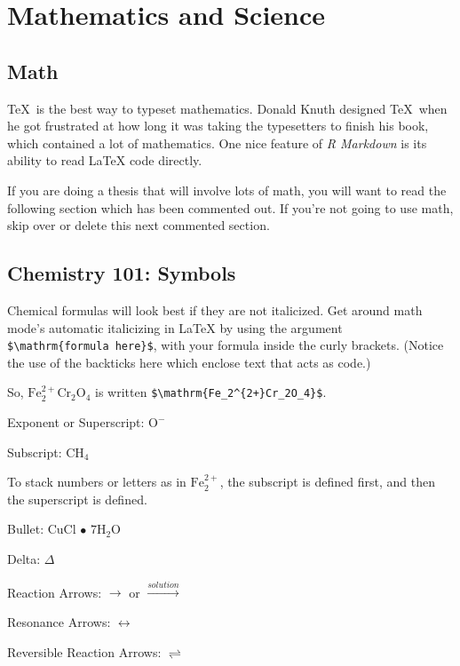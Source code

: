 \documentclass[12pt,twoside]{reedthesis}
\theoremstyle{definition}
\theoremstyle{definition}
\theoremstyle{definition}
\theoremstyle{remark}
\begin{document}
\chapter{Mathematics and Science}\label{math-sci}

\section{Math}\label{math}

\TeX~is the best way to typeset mathematics. Donald Knuth designed
\TeX~when he got frustrated at how long it was taking the typesetters to
finish his book, which contained a lot of mathematics. One nice feature
of \emph{R Markdown} is its ability to read LaTeX code directly.

If you are doing a thesis that will involve lots of math, you will want
to read the following section which has been commented out. If you're
not going to use math, skip over or delete this next commented section.

\section{Chemistry 101: Symbols}\label{chemistry-101-symbols}

Chemical formulas will look best if they are not italicized. Get around
math mode's automatic italicizing in LaTeX by using the argument
\texttt{\$\textbackslash{}mathrm\{formula\ here\}\$}, with your formula
inside the curly brackets. (Notice the use of the backticks here which
enclose text that acts as code.)

So, \(\mathrm{Fe_2^{2+}Cr_2O_4}\) is written
\texttt{\$\textbackslash{}mathrm\{Fe\_2\^{}\{2+\}Cr\_2O\_4\}\$}.

\noindent Exponent or Superscript: \(\mathrm{O^-}\)

\noindent Subscript: \(\mathrm{CH_4}\)

To stack numbers or letters as in \(\mathrm{Fe_2^{2+}}\), the subscript
is defined first, and then the superscript is defined.

\noindent Bullet: CuCl \(\bullet\) \(\mathrm{7H_{2}O}\)

\noindent Delta: \(\Delta\)

\noindent Reaction Arrows: \(\longrightarrow\) or
\(\xrightarrow{solution}\)

\noindent Resonance Arrows: \(\leftrightarrow\)

\noindent Reversible Reaction Arrows: \(\rightleftharpoons\)
\end{document}
